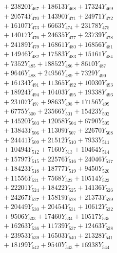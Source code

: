 \documentclass[a4paper,10pt]{article}
\begin{document}
{\begin{align}
&\;  + 23820 Y_{467} + 18613 Y_{468} + 17324 Y_{469} \\[0.3ex]
&\;  + 20574 Y_{470} + 14390 Y_{471} + 24971 Y_{472} \\[0.3ex]
&\;  + 16107 Y_{473} + 6663 Y_{474} + 23178 Y_{475} \\[0.3ex]
&\;  + 14017 Y_{476} + 24635 Y_{477} + 23739 Y_{478} \\[0.5ex]\allowbreak
&\;  + 24189 Y_{479} + 16861 Y_{480} + 16856 Y_{481} \\[0.3ex]
&\;  + 14946 Y_{482} + 17583 Y_{483} + 15161 Y_{484} \\[0.3ex]
&\;  + 7352 Y_{485} + 18852 Y_{486} + 8610 Y_{487} \\[0.3ex]
&\;  + 9646 Y_{488} + 24956 Y_{489} + 7329 Y_{490} \\[0.3ex]
&\;  + 16134 Y_{491} + 11365 Y_{492} + 10030 Y_{493} \\[0.3ex]
&\;  + 18924 Y_{494} + 10403 Y_{495} + 19338 Y_{496} \\[0.3ex]
&\;  + 23107 Y_{497} + 9863 Y_{498} + 17156 Y_{499} \\[0.3ex]
&\;  + 6775 Y_{500} + 23566 Y_{501} + 15423 Y_{502} \\[0.3ex]
&\;  + 14520 Y_{503} + 12058 Y_{504} + 6790 Y_{505} \\[0.3ex]
&\;  + 13843 Y_{506} + 11309 Y_{507} + 22670 Y_{508} \\[0.5ex]\allowbreak
&\;  + 24441 Y_{509} + 21512 Y_{510} + 7933 Y_{511} \\[0.3ex]
&\;  + 10494 Y_{512} + 7160 Y_{513} + 10464 Y_{514} \\[0.3ex]
&\;  + 15797 Y_{515} + 22576 Y_{516} + 24046 Y_{517} \\[0.3ex]
&\;  + 18423 Y_{518} + 18777 Y_{519} + 9450 Y_{520} \\[0.3ex]
&\;  + 11556 Y_{521} + 7568 Y_{522} + 10514 Y_{523} \\[0.3ex]
&\;  + 22201 Y_{524} + 18422 Y_{525} + 14136 Y_{526} \\[0.3ex]
&\;  + 24267 Y_{527} + 15819 Y_{528} + 21373 Y_{529} \\[0.3ex]
&\;  + 20449 Y_{530} + 20454 Y_{531} + 10612 Y_{532} \\[0.3ex]
&\;  + 9506 Y_{533} + 17460 Y_{534} + 10517 Y_{535} \\[0.3ex]
&\;  + 16263 Y_{536} + 11739 Y_{537} + 12463 Y_{538} \\[0.5ex]\allowbreak
&\;  + 23953 Y_{539} + 16503 Y_{540} + 21328 Y_{541} \\[0.3ex]
&\;  + 18199 Y_{542} + 9540 Y_{543} + 16938 Y_{544} \\[0.3ex]

\end{align}}
\end{document}
